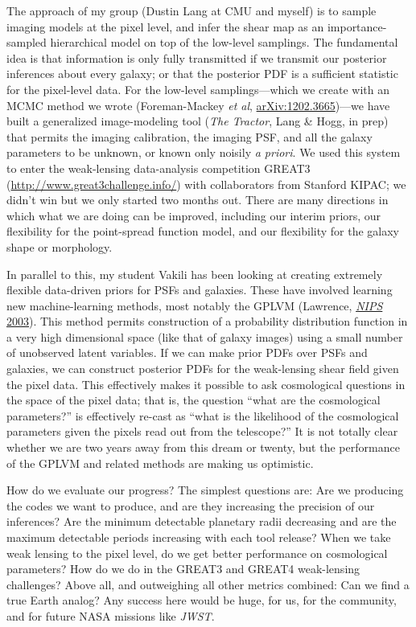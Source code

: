\documentclass[11pt, letterpaper]{article}
\newcommand{\arxiv}[1]{\href{http://arxiv.org/abs/#1}{arXiv:#1}}
\begin{document}
The approach of my group (Dustin Lang at CMU and myself) is to sample
imaging models at the pixel level, and infer the shear map as an
importance-sampled hierarchical model on top of the low-level
samplings.
The fundamental idea is that information is only fully transmitted if
we transmit our posterior inferences about every galaxy; or that the
posterior PDF is a sufficient statistic for the pixel-level data.
For the low-level samplings---which we create with an MCMC method we
wrote (Foreman-Mackey \textit{et al}, \arxiv{1202.3665})---we have
built a generalized image-modeling tool (\textsl{The Tractor}, Lang \&
Hogg, in prep) that permits the imaging calibration, the imaging PSF,
and all the galaxy parameters to be unknown, or known only noisily
\textit{a priori}.
We used this system to enter the weak-lensing data-analysis
competition GREAT3 (\url{http://www.great3challenge.info/})
with collaborators from Stanford KIPAC;
we didn't win but we only started two months out.
There are many directions in which what we are doing can be improved,
including our interim priors, our flexibility for the point-spread
function model, and our flexibility for the galaxy shape or
morphology.

In parallel to this, my student Vakili has been looking at creating
extremely flexible data-driven priors for PSFs and galaxies.
These have involved learning new machine-learning methods,
most notably the GPLVM
(Lawrence, \href{http://papers.nips.cc/paper/2540-gaussian-process-latent-variable-models-for-visualisation-of-high-dimensional-data.pdf}{\textit{NIPS} 2003}).
This method permits construction of a probability distribution
function in a very high dimensional space (like that of galaxy images)
using a small number of unobserved latent variables.
If we can make prior PDFs over PSFs and galaxies, we can construct
posterior PDFs for the weak-lensing shear field given the pixel data.
This effectively makes it possible to ask cosmological questions in
the space of the pixel data; that is, the question ``what are the
cosmological parameters?'' is effectively re-cast as ``what is the
likelihood of the cosmological parameters given the pixels read out
from the telescope?''
It is not totally clear whether we are two years away from this dream
or twenty, but the performance of the GPLVM and related methods are
making us optimistic.

How do we evaluate our progress?
The simplest questions are: Are we producing the codes we want to
produce, and are they increasing the precision of our inferences?
Are the minimum detectable planetary radii decreasing and are the
maximum detectable periods increasing with each tool release?
When we take weak lensing to the pixel level, do we get better
performance on cosmological parameters?
How do we do in the GREAT3 and GREAT4 weak-lensing challenges?
Above all, and outweighing all other metrics combined:
Can we find a true Earth analog?
Any success here would be huge, for us, for the community, and for
future NASA missions like \textsl{JWST}.
\end{document}
